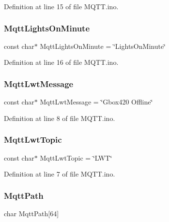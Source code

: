 Definition at line 15 of file M\+Q\+T\+T.\+ino.

\mbox{\label{_m_q_t_t_8ino_a30d5be777446e70b4aacb0082045d41f}} 
\subsubsection{\texorpdfstring{MqttLightsOnMinute}{MqttLightsOnMinute}}
{\footnotesize\ttfamily const char$\ast$ Mqtt\+Lights\+On\+Minute = \char`\"{}Lights\+On\+Minute\char`\"{}}



Definition at line 16 of file M\+Q\+T\+T.\+ino.

\mbox{\label{_m_q_t_t_8ino_ab489bce6689dd67335d708fbf2dbc518}} 
\subsubsection{\texorpdfstring{MqttLwtMessage}{MqttLwtMessage}}
{\footnotesize\ttfamily const char$\ast$ Mqtt\+Lwt\+Message = \char`\"{}Gbox420 Offline\char`\"{}}



Definition at line 8 of file M\+Q\+T\+T.\+ino.

\mbox{\label{_m_q_t_t_8ino_a4167baa8d7d8ab8b721d5b13b0bba596}} 
\subsubsection{\texorpdfstring{MqttLwtTopic}{MqttLwtTopic}}
{\footnotesize\ttfamily const char$\ast$ Mqtt\+Lwt\+Topic = \char`\"{}L\+WT\char`\"{}}



Definition at line 7 of file M\+Q\+T\+T.\+ino.

\mbox{\label{_m_q_t_t_8ino_ab5c7ea7beebf38f09a21ee747b1c9a12}} 
\subsubsection{\texorpdfstring{MqttPath}{MqttPath}}
{\footnotesize\ttfamily char Mqtt\+Path\mbox{[}64\mbox{]}}



